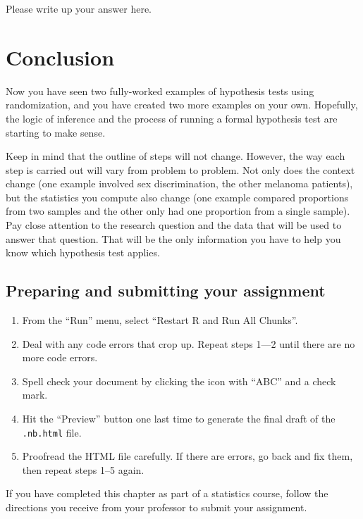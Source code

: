 \documentclass[
]{book}
\providecommand{\tightlist}{%
  \setlength{\itemsep}{0pt}\setlength{\parskip}{0pt}}
\begin{document}
Please write up your answer here.

\hypertarget{hypothesis2-conclusion}{%
\section{Conclusion}\label{hypothesis2-conclusion}}

Now you have seen two fully-worked examples of hypothesis tests using randomization, and you have created two more examples on your own. Hopefully, the logic of inference and the process of running a formal hypothesis test are starting to make sense.

Keep in mind that the outline of steps will not change. However, the way each step is carried out will vary from problem to problem. Not only does the context change (one example involved sex discrimination, the other melanoma patients), but the statistics you compute also change (one example compared proportions from two samples and the other only had one proportion from a single sample). Pay close attention to the research question and the data that will be used to answer that question. That will be the only information you have to help you know which hypothesis test applies.

\hypertarget{hypothesis2-prep}{%
\subsection{Preparing and submitting your assignment}\label{hypothesis2-prep}}

\begin{enumerate}
\def\labelenumi{\arabic{enumi}.}
\tightlist
\item
  From the ``Run'' menu, select ``Restart R and Run All Chunks''.
\item
  Deal with any code errors that crop up. Repeat steps 1---2 until there are no more code errors.
\item
  Spell check your document by clicking the icon with ``ABC'' and a check mark.
\item
  Hit the ``Preview'' button one last time to generate the final draft of the \texttt{.nb.html} file.
\item
  Proofread the HTML file carefully. If there are errors, go back and fix them, then repeat steps 1--5 again.
\end{enumerate}

If you have completed this chapter as part of a statistics course, follow the directions you receive from your professor to submit your assignment.
\end{document}
